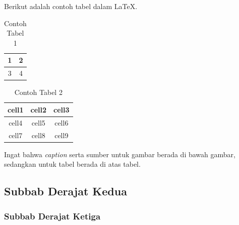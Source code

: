 Berikut adalah contoh tabel dalam \LaTeX.
\begin{table}[H]
    \centering
    \caption{Contoh Tabel 1}
    \begin{tabular}{|c|c|}
        \hline
        1 & 2 \\
        \hline
        3 & 4\\
        \hline
    \end{tabular}
    \label{tab:my_table}
\end{table}

\begin{table}[H]
    \centering
    \caption{Contoh Tabel 2}
    \begin{tabular}{ |c|c|c| } 
        \hline
        cell1 & cell2 & cell3 \\ 
        \hline
        cell4 & cell5 & cell6 \\ 
        cell7 & cell8 & cell9 \\ 
        \hline
    \end{tabular}
    \label{tab:my_label2}
\end{table}

\begin{remark}
    Ingat bahwa \textit{caption} serta sumber untuk gambar berada di bawah gambar, sedangkan untuk tabel berada di atas tabel.
\end{remark}
\subsection{Subbab Derajat Kedua}
\lipsum[1]

\subsubsection{Subbab Derajat Ketiga}
\lipsum[1]